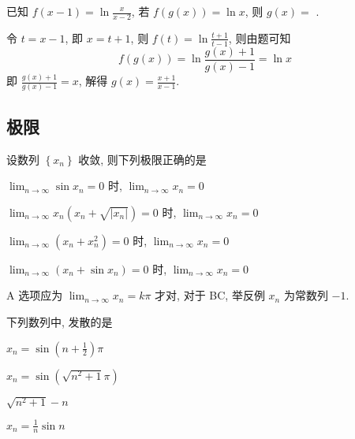 \begin{question}
  已知 $f\left(x-1 \right) = \ln \frac{x}{x-2}$,
  若 $f\left(g(x) \right) = \ln x$,
  则 $g(x) =$
  \fillin[$\frac{x+1}{x-1}$].
\end{question}

\begin{analysis}
  令 $t = x-1$,
  即 $x = t+1$,
  则 $f(t)= \ln\frac{t+1}{t-1}$,
  则由题可知
  \[
    f(g(x))= \ln\frac{g(x)+1}{g(x)-1}= \ln x
  \]
  即 $\frac{g(x)+1}{g(x)-1} = x$,
  解得 $g(x)= \frac{x+1}{x-1}$.
\end{analysis}

\subsection{极限}

\begin{question}
  设数列 $\left\{x_{n}\right\}$ 收敛,
  则下列极限正确的是
  \paren[D]
  \begin{choices}
    \item $\lim_{n \to \infty} \sin x_{n} = 0$ 时, $\lim_{n \to \infty} x_{n} = 0$
    \item $\lim_{n \to \infty} x_{n}\left(x_{n}+\sqrt{\left|x_{n}\right|}\right) = 0$ 时, $\lim_{n \to \infty} x_{n} = 0$
    \item $\lim_{n \to \infty}\left(x_{n}+x_{n}^{2}\right) = 0$ 时, $\lim_{n \to \infty} x_{n} = 0$
    \item $\lim_{n \to \infty}\left(x_{n}+\sin x_{n}\right) = 0$ 时, $\lim_{n \to \infty} x_{n} = 0$
  \end{choices}
\end{question}

\begin{analysis}
  A 选项应为 $\lim_{n \to \infty} x_{n} = k \pi$ 才对,
  对于 BC,
  举反例 $x_n$ 为常数列 $-1$.
\end{analysis}

\begin{question}
  下列数列中,
  发散的是
  \paren[A]
  \begin{choices}
    \item $x_{n}= \sin \left(n+\frac{1}{2}\right) \pi$
    \item $x_{n}= \sin \left(\sqrt{n^{2}+1} \pi\right)$
    \item $\sqrt{n^{2}+1}-n$
    \item $x_{n}= \frac{1}{n} \sin n$
  \end{choices}
\end{question}

